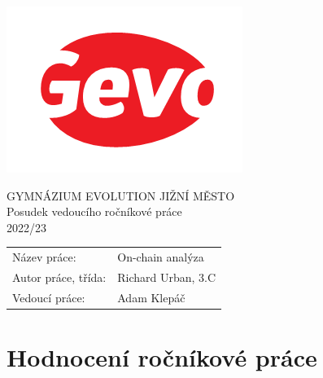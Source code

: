 \documentclass[a4paper,10pt]{article}
\begin{document}
\thispagestyle{fancy}
\begin{minipage}{.3\textwidth}
 \includegraphics[width=\textwidth]{logo}
\end{minipage}
\hfill
\begin{minipage}{.69\textwidth}
 \centering
 \Large{\sffamily
  GYMNÁZIUM EVOLUTION JIŽNÍ MĚSTO\\
  Posudek vedoucího ročníkové práce\\
  2022/23
 }
\end{minipage}

\begin{center}
 \large{
 \begin{tabular}{ll}
  \textsf{Název práce:} &
  \textsf{
   On-chain analýza
  }\\
  \textsf{Autor práce, třída:} &
  \textsf{
   Richard Urban, 3.C
  }\\
  \textsf{Vedoucí práce:} &
  \textsf{
   Adam Klepáč
  }
 \end{tabular}
 }
\end{center}

\section*{\sffamily \centering Hodnocení ročníkové práce}
\end{document}

